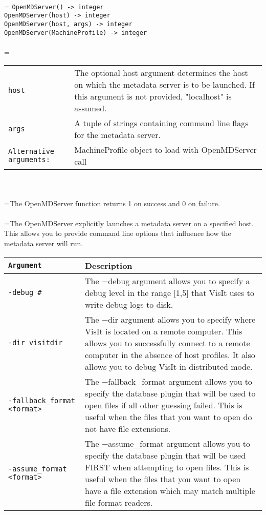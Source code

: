 \documentclass[10pt,a4paper]{report}
\begin{document}
 \\ 
\hangindent=\parindent 
\verb!OpenMDServer() -> integer!\\ 
\verb!OpenMDServer(host) -> integer!\\ 
\verb!OpenMDServer(host, args) -> integer!\\ 
\verb!OpenMDServer(MachineProfile) -> integer!\\ [-3mm]

 \\ 
\hangindent=\parindent 
\begin{tabular}{lp{9cm}}
\verb!host! & The optional host argument determines the host on which the metadata server is to be launched. If this argument is not provided, "localhost" is assumed. \\
\verb!args! & A tuple of strings containing command line flags for the metadata server. \\
\verb!Alternative arguments:! & MachineProfile object to load with OpenMDServer call \\
\end{tabular} \\[-2mm]


 \\ 
\hangindent=\parindent The OpenMDServer function returns 1 on success and 0 on failure. \\[-3mm] 

 \\ 
\hangindent=\parindent The OpenMDServer explicitly launches a metadata server on a specified host. This allows you to provide command line options that influence how the metadata server will run. \\

\begin{tabular}{|l|p{9cm}|}
\hline
\verb!Argument! & Description \\
\hline \hline
\verb!-debug #! & The $-$debug argument allows you to specify a debug level in the range [1,5] that VisIt uses to write debug logs to disk. \\
\verb!-dir visitdir! & The $-$dir argument allows you to specify where VisIt is located on a remote computer. This allows you to successfully  connect to a remote computer in the absence of host profiles.  It also allows you to debug VisIt in distributed mode. \\
\verb!-fallback_format <format>! & The $-$fallback\_format argument allows you to specify the database plugin that will be used to open files if all other guessing failed. This is useful when the files that you want to open do not have file extensions. \\
\verb!-assume_format <format>! & The $-$assume\_format argument allows you to specify the database plugin that will be used FIRST when attempting to open files. This is useful when the files that you  want to open have a file extension which may match multiple file format readers. \\
\hline
\end{tabular} \\[-2mm]
\\[-3mm] 
\end{document}

